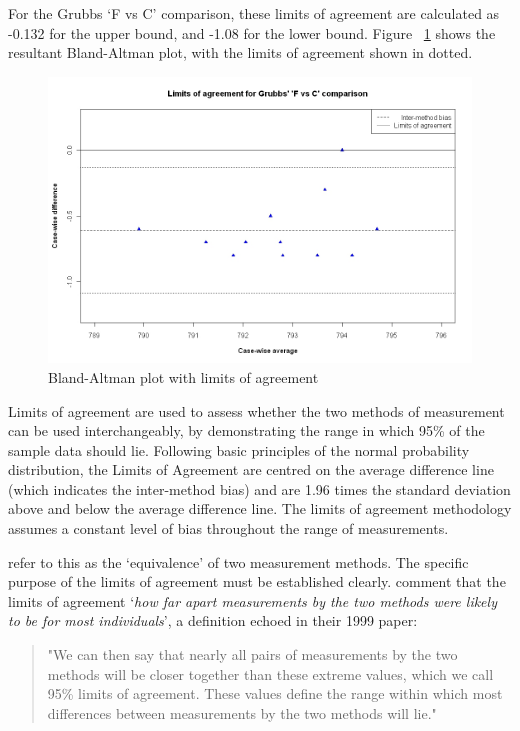 \documentclass[12pt, a4paper]{report}
\theoremstyle{plain}
\theoremstyle{definition}
\theoremstyle{remark}
\begin{document}
For the Grubbs `F vs C' comparison, these limits
of agreement are calculated as -0.132 for the upper bound, and
-1.08 for the lower bound. Figure ~\ref{GrubbsBAplot-noLOA} shows the resultant
Bland-Altman plot, with the limits of agreement shown in dotted.


\begin{figure}[h!]
	\begin{center}
		\includegraphics[width=125mm]{images/GrubbsBAplot-LOA.jpeg}
		\caption{Bland-Altman plot with limits of agreement}
		\label{GrubbsBAplot-noLOA}
	\end{center}
\end{figure}

Limits of agreement are used to assess whether the two methods of
measurement can be used interchangeably, by demonstrating the range in which 95\% of the sample data should lie. Following basic principles of the normal probability distribution, the Limits of Agreement are centred on the average difference line (which indicates the inter-method bias) and are 1.96 times the standard deviation
above and below the average difference line. The limits of agreement methodology assumes a constant level of bias throughout the range of measurements. 

\citet{BA86} refer to
this as the `equivalence' of two measurement methods. The specific purpose of the limits of
agreement must be
established clearly. \citet*{BA95} comment that the limits of agreement `\textit{how
	far apart measurements by the two methods were likely to be for
	most individuals}', a definition echoed in their 1999 paper:

\begin{quote}"We can then say that nearly all pairs
	of measurements by the two methods will be closer together than
	these extreme values, which we call 95\% limits of agreement.
	These values define the range within which most differences
	between measurements by the two methods will lie."
\end{quote}
\end{document}
